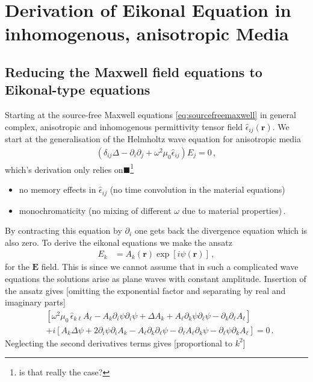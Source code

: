 \documentclass[12pt,a4paper,twoside,openright,BCOR10mm,headsepline,titlepage,abstracton,chapterprefix,final]{scrreprt}
\newcommand\Vector[1]{{\mathbf{#1}}}
\newcommand\Tensor[1]{\hat{#1}}
\newcommand\permittivity{\Tensor{\epsilon}}
\newcommand{\remark}[1]{{\color{red}$\blacksquare$}\footnote{{\color{red}#1}}}
\begin{document}
\section{Derivation of Eikonal Equation in inhomogenous, anisotropic Media}

\subsection{Reducing the Maxwell field equations to Eikonal-type equations}
Starting at the source-free Maxwell equations \eqref{eq:sourcefreemaxwell} 
in general complex, anisotropic and inhomogenous
permittivity tensor field $\hat{\epsilon}_{ij}(\Vector{r})$.
We start at the generalisation of the Helmholtz wave equation for anisotropic media
\begin{align}
 (\delta_{ij} \Delta - \partial_i \partial_j + \omega^2 \mu_0 \permittivity_{ij}) E_j = 0\,,
\end{align}
which's derivation only relies on\remark{is that really the case?}
\begin{itemize}
 \item no memory effects in $\permittivity_{ij}$ (no time convolution in the material equations)
 \item monochromaticity (no mixing of different $\omega$ due to material properties)\,.
\end{itemize}
By contracting this equation by $\partial_i$ one gets back the divergence equation which is also zero.
To derive the eikonal equations we make the ansatz
\begin{align}
 E_k &= A_k(\Vector{r}) \exp[i \psi(\Vector{r})]\,,
\end{align}
for the $\Vector{E}$ field. This is since we cannot assume that in such a complicated wave equations 
the solutions arise as plane waves with constant amplitude. Insertion of the ansatz gives [omitting the 
exponential factor and separating by real and imaginary parts]
\begin{align}
    & \left[
     \omega^2 \mu_0\, \permittivity_{k\ell}A_\ell
    -A_k \partial_i \psi \partial_i \psi
   +\Delta A_k 
   +A_\ell \partial_k \psi \partial_\ell \psi
   -\partial_k \partial_\ell A_\ell
   \right] \nonumber\\&
   +i \left[
    A_k \Delta \psi
    +2\partial_i \psi \partial_i A_k
    -A_\ell \partial_k \partial_\ell \psi
    -\partial_\ell A_\ell \partial_k \psi
    -\partial_\ell \psi \partial_k A_\ell
   \right] = 0\,.
\end{align}
Neglecting the second derivatives terms gives [proportional to $k^2$]
\end{document}
